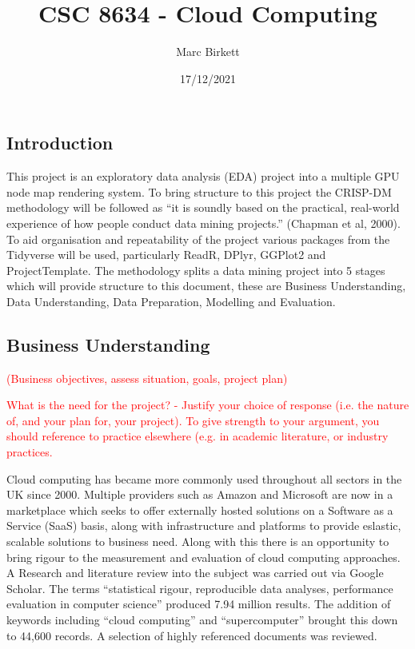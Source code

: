 \documentclass[
  twocolumn]{article}
\title{CSC 8634 - Cloud Computing}
\author{Marc Birkett}
\date{17/12/2021}
\begin{document}
\maketitle

\hypertarget{introduction}{%
\subsection{Introduction}\label{introduction}}

This project is an exploratory data analysis (EDA) project into a
multiple GPU node map rendering system. To bring structure to this
project the CRISP-DM methodology will be followed as ``it is soundly
based on the practical, real-world experience of how people conduct data
mining projects.'' (Chapman et al, 2000). To aid organisation and
repeatability of the project various packages from the Tidyverse will be
used, particularly ReadR, DPlyr, GGPlot2 and ProjectTemplate. The
methodology splits a data mining project into 5 stages which will
provide structure to this document, these are Business Understanding,
Data Understanding, Data Preparation, Modelling and Evaluation.

\hypertarget{business-understanding}{%
\subsection{Business Understanding}\label{business-understanding}}

\textcolor{red}{(Business objectives, assess situation, goals, project plan)}

\textcolor{red}{What is the need for the project? - Justify your choice of response (i.e. the nature of, and your plan for, your project). To give strength to your argument, you should reference to practice elsewhere (e.g. in academic literature, or industry practices.}

Cloud computing has became more commonly used throughout all sectors in
the UK since 2000. Multiple providers such as Amazon and Microsoft are
now in a marketplace which seeks to offer externally hosted solutions on
a Software as a Service (SaaS) basis, along with infrastructure and
platforms to provide eslastic, scalable solutions to business need.
Along with this there is an opportunity to bring rigour to the
measurement and evaluation of cloud computing approaches. A Research and
literature review into the subject was carried out via Google Scholar.
The terms ``statistical rigour, reproducible data analyses, performance
evaluation in computer science'' produced 7.94 million results. The
addition of keywords including ``cloud computing'' and ``supercomputer''
brought this down to 44,600 records. A selection of highly referenced
documents was reviewed.
\end{document}
